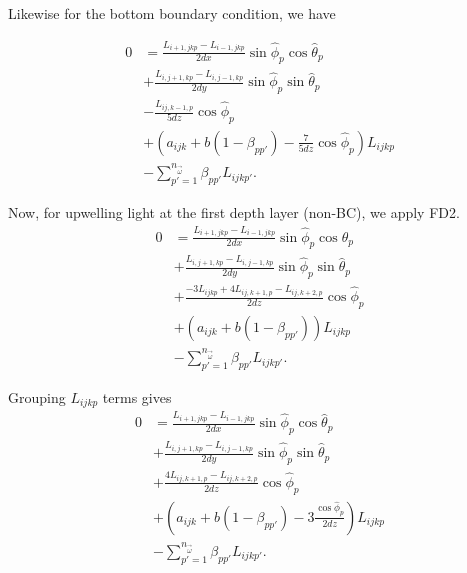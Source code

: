 Likewise for the bottom boundary condition, we have

\begin{equation}
  \begin{aligned}
    0 &= \frac{L_{i+1,jkp}-L_{i-1,jkp}}{2dx}\sin\hat{\phi}_p\cos\hat{\theta}_p \\
    &+ \frac{L_{i,j+1,kp}-L_{i,j-1,kp}}{2dy}\sin\hat{\phi}_p\sin\hat{\theta}_p \\
    &- \frac{L_{ij,k-1,p}}{5dz}\cos\hat{\phi}_p \\
    &+ (a_{ijk}+b(1-\beta_{pp'}) - \frac{7}{5dz}\cos\hat{\phi}_p)L_{ijkp} \\
    &- \sum_{p'=1}^{n_{\vec{\omega}}} \beta_{pp'} L_{ijkp'}.
  \end{aligned}
\end{equation}

Now, for upwelling light at the first depth layer (non-BC), we apply FD2.
\begin{equation}
  \begin{aligned}
    0 &= \frac{L_{i+1,jkp}-L_{i-1,jkp}}{2dx}\sin\hat{\phi}_p\cos\hat{\theta}_p \\
    &+ \frac{L_{i,j+1,kp}-L_{i,j-1,kp}}{2dy}\sin\hat{\phi}_p\sin\hat{\theta}_p \\
    &+ \frac{-3L_{ijkp} + 4L_{ij,k+1,p} - L_{ij,k+2,p}}{2dz}\cos\hat{\phi}_p \\
    &+ (a_{ijk}+b(1-\beta_{pp'}))L_{ijkp} \\
    &- \sum_{p'=1}^{n_{\vec{\omega}}} \beta_{pp'} L_{ijkp'}.
  \end{aligned}
\end{equation}

Grouping $L_{ijkp}$ terms gives
\begin{equation}
  \begin{aligned}
    0 &= \frac{L_{i+1,jkp}-L_{i-1,jkp}}{2dx}\sin\hat{\phi}_p\cos\hat{\theta}_p \\
    &+ \frac{L_{i,j+1,kp}-L_{i,j-1,kp}}{2dy}\sin\hat{\phi}_p\sin\hat{\theta}_p \\
    &+ \frac{4L_{ij,k+1,p} - L_{ij,k+2,p}}{2dz}\cos\hat{\phi}_p \\
    &+ \left(a_{ijk}+b(1-\beta_{pp'}) - 3\frac{\cos\hat\phi_p}{2dz} \right)L_{ijkp} \\
    &- \sum_{p'=1}^{n_{\vec{\omega}}} \beta_{pp'} L_{ijkp'}.
  \end{aligned}
\end{equation}

